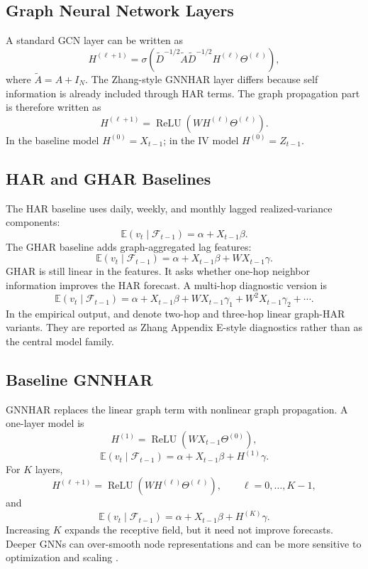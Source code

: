 \documentclass[11pt,a4paper]{article}
\newcommand{\model}[1]{\texttt{\detokenize{#1}}}
\begin{document}
\subsection{Graph Neural Network Layers}
\label{subsec:gnn}

A standard GCN layer can be written as \citep{kipf2017gcn}
\[
H^{(\ell+1)}
=
\sigma\!\left(
\widetilde{D}^{-1/2}\widetilde{A}\widetilde{D}^{-1/2}
H^{(\ell)}\Theta^{(\ell)}
\right),
\]
where \(\widetilde A=A+I_N\).  The Zhang-style GNNHAR layer differs because self information is already included through HAR terms.  The graph propagation part is therefore written as
\[
H^{(\ell+1)}
=
\operatorname{ReLU}\!\left(W H^{(\ell)}\Theta^{(\ell)}\right).
\]
In the baseline model \(H^{(0)}=X_{t-1}\); in the IV model \(H^{(0)}=Z_{t-1}\).

\subsection{HAR and GHAR Baselines}
\label{subsec:har-ghar}

The HAR baseline uses daily, weekly, and monthly lagged realized-variance components:
\[
\mathbb{E}(v_t\mid\mathcal{F}_{t-1})
=
\alpha + X_{t-1}\beta.
\]
The GHAR baseline adds graph-aggregated lag features:
\[
\mathbb{E}(v_t\mid\mathcal{F}_{t-1})
=
\alpha + X_{t-1}\beta + WX_{t-1}\gamma.
\]
GHAR is still linear in the features.  It asks whether one-hop neighbor information improves the HAR forecast.  A multi-hop diagnostic version is
\[
\mathbb{E}(v_t\mid\mathcal{F}_{t-1})
=
\alpha + X_{t-1}\beta
+WX_{t-1}\gamma_1
+W^2X_{t-1}\gamma_2+\cdots.
\]
In the empirical output, \model{GHAR2H} and \model{GHAR3H} denote two-hop and three-hop linear graph-HAR variants.  They are reported as Zhang Appendix E-style diagnostics rather than as the central model family.

\subsection{Baseline GNNHAR}
\label{subsec:gnnhar}

GNNHAR replaces the linear graph term with nonlinear graph propagation.  A one-layer model is
\[
H^{(1)}
=
\operatorname{ReLU}\!\left(WX_{t-1}\Theta^{(0)}\right),
\]
\[
\mathbb{E}(v_t\mid\mathcal{F}_{t-1})
=
\alpha + X_{t-1}\beta + H^{(1)}\gamma.
\]
For \(K\) layers,
\[
H^{(\ell+1)}
=
\operatorname{ReLU}\!\left(W H^{(\ell)}\Theta^{(\ell)}\right),
\qquad
\ell=0,\ldots,K-1,
\]
and
\[
\mathbb{E}(v_t\mid\mathcal{F}_{t-1})
=
\alpha + X_{t-1}\beta + H^{(K)}\gamma.
\]
Increasing \(K\) expands the receptive field, but it need not improve forecasts.  Deeper GNNs can over-smooth node representations and can be more sensitive to optimization and scaling \citep{chen2020oversmoothing}.
\end{document}
